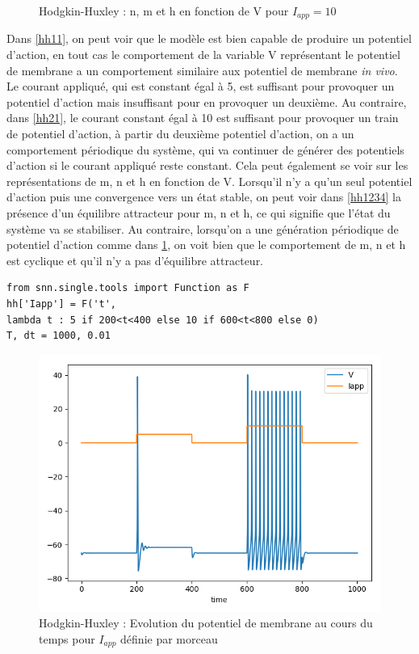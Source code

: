 \documentclass[12pt]{scrartcl}
\begin{document}
\begin{figure}[!h]
\begin{minipage}[l]{.3\linewidth}
\end{minipage}\hfill
\caption{Hodgkin-Huxley : n, m et h en fonction de V pour $I_{app} = 10$}
\label{hh2234}
\end{figure}

Dans \ref{hh11}, on peut voir que le modèle est bien capable de produire un potentiel d'action, en tout cas le comportement de la variable V représentant le potentiel de membrane a un comportement similaire aux potentiel de membrane \textit{in vivo}. Le courant appliqué, qui est constant égal à 5, est suffisant pour provoquer un potentiel d'action mais insuffisant pour en provoquer un deuxième. Au contraire, dans \ref{hh21}, le courant constant égal à 10 est suffisant pour provoquer un train de potentiel d'action, à partir du deuxième potentiel d'action, on a un comportement périodique du système, qui va continuer de générer des potentiels d'action si le courant appliqué reste constant. Cela peut également se voir sur les représentations de m, n et h en fonction de V. Lorsqu'il n'y a qu'un seul potentiel d'action puis une convergence vers un état stable, on peut voir dans \ref{hh1234} la présence d'un équilibre attracteur pour m, n et h, ce qui signifie que l'état du système va se stabiliser. Au contraire, lorsqu'on a une génération périodique de potentiel d'action comme dans \ref{hh2234}, on voit bien que le comportement de m, n et h est cyclique et qu'il n'y a pas d'équilibre attracteur.

\begin{lstlisting}[caption = {Hodgkin-Huxley : Simulation du modèle pour $I_{app}$ définie par morceau}]
from snn.single.tools import Function as F
hh['Iapp'] = F('t', 
lambda t : 5 if 200<t<400 else 10 if 600<t<800 else 0)
T, dt = 1000, 0.01
\end{lstlisting}

\begin{figure}[!h]
\centering
\includegraphics[scale=0.8]{imgs/hh31.png}
\caption{Hodgkin-Huxley : Evolution du potentiel de membrane au cours du temps pour $I_{app}$ définie par morceau}
\label{hh31}
\end{figure}
\end{document}

